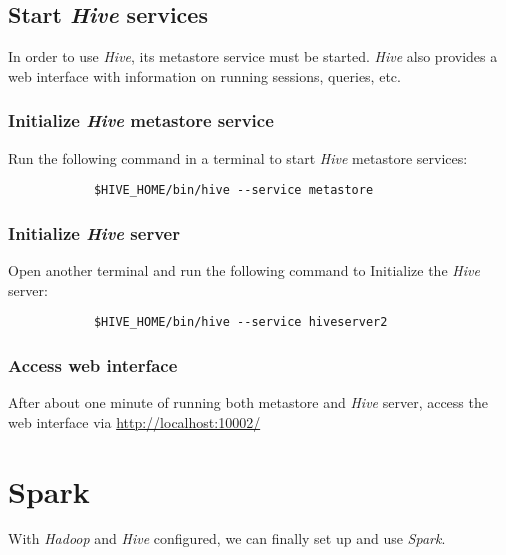 \documentclass{article}
\begin{document}
    \subsection{Start \emph{Hive} services}
    \label{subsec:hiveservices}
    In order to use \emph{Hive}, its metastore service must be started. \emph{Hive} also provides
    a web interface with information on running sessions, queries, etc.

        \subsubsection{Initialize \emph{Hive} metastore service}
        Run the following command in a terminal to start \emph{Hive} metastore services:
        \begin{verbatim}
            $HIVE_HOME/bin/hive --service metastore
        \end{verbatim}

        \subsubsection{Initialize \emph{Hive} server}
        Open another terminal and run the following command to Initialize the \emph{Hive} server:
        \begin{verbatim}
            $HIVE_HOME/bin/hive --service hiveserver2
        \end{verbatim}

        \subsubsection{Access web interface}
        After about one minute of running both metastore and \emph{Hive} server, access the web
        interface via \url{http://localhost:10002/}

\section{Spark}
With \emph{Hadoop} and \emph{Hive} configured, we can finally set up and use \emph{Spark}.
\end{document}
